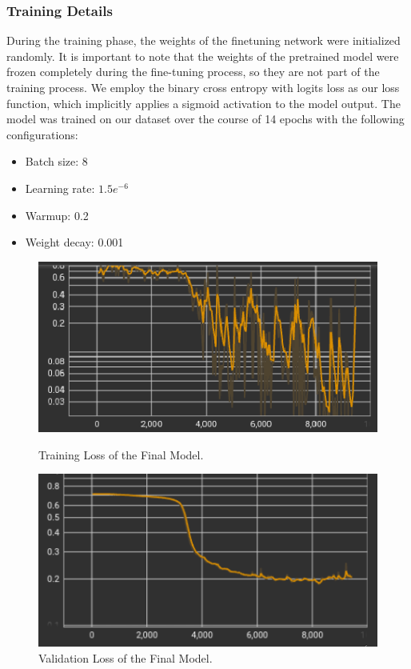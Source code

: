 \documentclass[a4paper,10pt]{report}
\begin{document}
\subsubsection{Training Details}
During the training phase, the weights of the finetuning network were initialized randomly. It is important to note that the weights of the pretrained model were frozen completely during the fine-tuning process, so they are not part of the training process. We employ the binary cross entropy with logits loss as our loss function, which implicitly applies a sigmoid activation to the model output. The model was trained on our dataset over the course of 14 epochs with the following configurations: 
\begin{itemize}
  \item Batch size: 8
  \item Learning rate: $1.5e^{-6}$
  \item Warmup: 0.2
  \item Weight decay: 0.001
\end{itemize}
\begin{figure}[h]
  \begin{minipage}[b]{0.49\textwidth}
    \centering
    \includegraphics[width=\textwidth]{img/final_model_train_loss.png}
    \caption{Training Loss of the Final Model.}
    \label{fig:final_train_loss}
  \end{minipage}
  \hfill
  \begin{minipage}[b]{0.49\textwidth}
    \centering
    \includegraphics[width=\textwidth]{img/final_model_val_loss.png}
    \caption{Validation Loss of the Final Model.}
    \label{fig:final_valid_loss}
  \end{minipage}
\end{figure}
\end{document}
